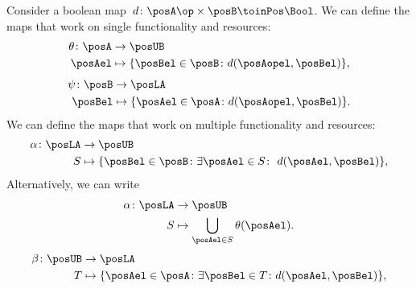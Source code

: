 Consider a boolean map~$d\colon \posA\op \times \posB \toinPos \Bool$.
We can define the maps that work on single functionality and resources:
%
\begin{equation}
	\begin{aligned}
		\theta\colon \posA & \to \posUB                                                  \\
		\posAel            & \mapsto \{\posBel\in \posB \colon d(\posAopel, \posBel) \},
	\end{aligned}
\end{equation}
%
\begin{equation}
	\begin{aligned}
		\psi\colon \posB & \to \posLA                                                  \\
		\posBel          & \mapsto \{\posAel\in \posA \colon d(\posAopel, \posBel) \}.
	\end{aligned}
\end{equation}
We can define the maps that work on multiple functionality and resources:
\begin{equation}
	\label{eq:galoisalfa}
	\begin{aligned}
		\alpha\colon \posLA & \to \posUB                                                                           \\
		S                   & \mapsto \{\posBel\in \posB \colon \exists \posAel\in S\colon \ d(\posAel,\posBel)\},
	\end{aligned}
\end{equation}
Alternatively, we can write
\begin{equation}
	\begin{aligned}
		\alpha \colon \posLA & \to \posUB                                      \\
		S                    & \mapsto \bigcup_{\posAel\in S} \theta(\posAel).
	\end{aligned}
\end{equation}
%
\begin{equation}
	\label{eq:galoisbeta}
	\begin{aligned}
		\beta\colon \posUB & \to \posLA                                                                          \\
		T                  & \mapsto \{\posAel\in \posA  \colon \exists \posBel\in T\colon d(\posAel,\posBel)\},
	\end{aligned}
\end{equation}
